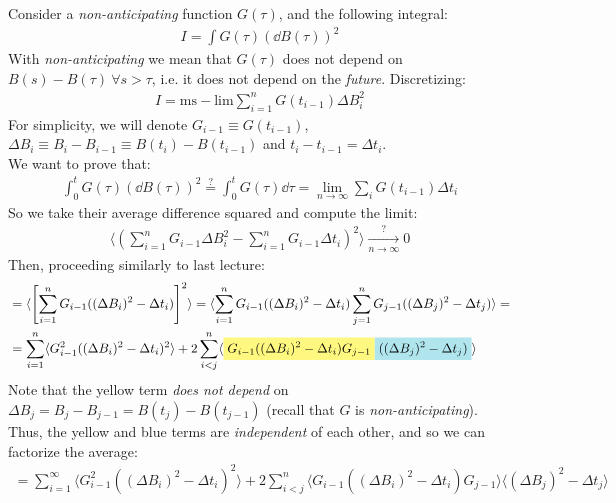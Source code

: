 \documentclass[../template.tex]{subfiles}
\begin{document}
\begin{example}[Integral in $\dd{B}^2$]
    Consider a \textit{non-anticipating} function $G(\tau)$, and the following integral:
    \begin{align*}
        I = \int G(\tau) (\dd{B}(\tau))^2
    \end{align*}   
    With \textit{non-anticipating} we mean that $G(\tau)$ does not depend on $B(s) - B(\tau) \> \forall s > \tau$, i.e. it does not depend on the \textit{future}. Discretizing:
    \begin{align*}
        I = \mathrm{ms-lim} \sum_{i=1}^n G(t_{i-1}) \Delta B_i^2 
    \end{align*}    
    For simplicity, we will denote $G_{i-1} \equiv G(t_{i-1})$,  $\Delta B_i \equiv B_i - B_{i-1} \equiv B(t_i) - B(t_{i-1})$ and $t_i - t_{i-1} = \Delta t_i$.\\
    We want to prove that:
    \begin{align*}
        \int_0^t G(\tau) (\dd{B(\tau)})^2 \overset{?}{=}  \int_0^t G(\tau) \dd{\tau} = \lim_{n \to \infty} \sum_i G(t_{i-1}) \Delta t_i
    \end{align*}  
    So we take their average difference squared and compute the limit:
    \begin{align*}
        \langle \left(\sum_{i=1}^n G_{i-1} \Delta B_i^2 - \sum_{i=1}^n G_{i-1} \Delta t_i\right)^2 \rangle  \xrightarrow[n \to \infty]{?}  0 
    \end{align*} 
    Then, proceeding similarly to last lecture:
    \begin{align*}
        &= \langle \left[\sum_{i=1}^n G_{i-1} ((\Delta B_i)^2 - \Delta t_i)\right]^2 \rangle = \langle \sum_{i=1}^{n} G_{i-1}((\Delta B_i)^2 - \Delta t_i) \sum_{j=1}^n G_{j-1} ((\Delta B_j)^2 - \Delta t_j) \rangle =\\
        &= \sum_{i=1}^n \langle G_{i-1}^2 ((\Delta B_i)^2 - \Delta t_i)^2 \rangle + 2\sum_{i<j}^n \langle\hlc{Yellow}{ G_{i-1} ((\Delta B_i)^2 - \Delta t_i) G_{j-1} }\hlc{SkyBlue}{((\Delta B_j)^2 - \Delta t_j)} \rangle
    \end{align*}
    Note that the yellow term \textit{does not depend} on $\Delta B_j = B_j - B_{j-1} = B(t_j) - B(t_{j-1})$ (recall that $G$ is \textit{non-anticipating}). Thus, the yellow and blue terms are \textit{independent} of each other, and so we can factorize the average:
    \begin{align*}
        = \sum_{i=1}^{\infty} \langle G_{i-1}^2 ((\Delta B_i)^2 - \Delta t_i)^2 \rangle + 2 \sum_{i<j}^n \langle G_{i-1}((\Delta B_i)^2 - \Delta t_i) G_{j-1} \rangle \langle (\Delta B_j)^2 - \Delta t_j \rangle

\end{align*}
\end{example}
\end{document}
